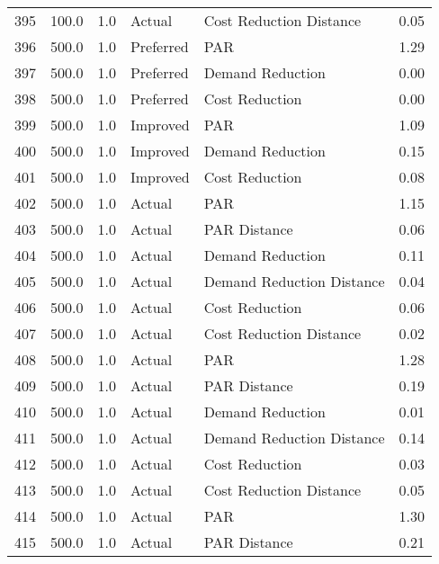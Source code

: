 \begin{longtable}{lrrllr}
395  &        100.0 &     1.0 &         Actual &    Cost Reduction Distance &   0.05 \\
396  &        500.0 &     1.0 &      Preferred &                        PAR &   1.29 \\
397  &        500.0 &     1.0 &      Preferred &           Demand Reduction &   0.00 \\
398  &        500.0 &     1.0 &      Preferred &             Cost Reduction &   0.00 \\
399  &        500.0 &     1.0 &       Improved &                        PAR &   1.09 \\
400  &        500.0 &     1.0 &       Improved &           Demand Reduction &   0.15 \\
401  &        500.0 &     1.0 &       Improved &             Cost Reduction &   0.08 \\
402  &        500.0 &     1.0 &         Actual &                        PAR &   1.15 \\
403  &        500.0 &     1.0 &         Actual &               PAR Distance &   0.06 \\
404  &        500.0 &     1.0 &         Actual &           Demand Reduction &   0.11 \\
405  &        500.0 &     1.0 &         Actual &  Demand Reduction Distance &   0.04 \\
406  &        500.0 &     1.0 &         Actual &             Cost Reduction &   0.06 \\
407  &        500.0 &     1.0 &         Actual &    Cost Reduction Distance &   0.02 \\
408  &        500.0 &     1.0 &         Actual &                        PAR &   1.28 \\
409  &        500.0 &     1.0 &         Actual &               PAR Distance &   0.19 \\
410  &        500.0 &     1.0 &         Actual &           Demand Reduction &   0.01 \\
411  &        500.0 &     1.0 &         Actual &  Demand Reduction Distance &   0.14 \\
412  &        500.0 &     1.0 &         Actual &             Cost Reduction &   0.03 \\
413  &        500.0 &     1.0 &         Actual &    Cost Reduction Distance &   0.05 \\
414  &        500.0 &     1.0 &         Actual &                        PAR &   1.30 \\
415  &        500.0 &     1.0 &         Actual &               PAR Distance &   0.21 \\

\end{longtable}
